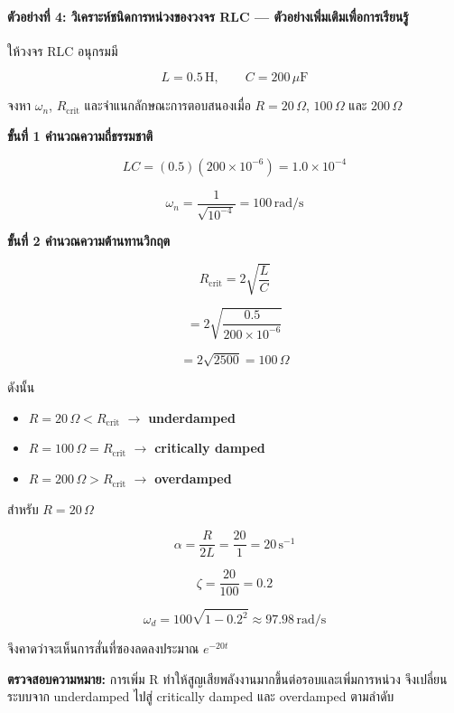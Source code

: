 \paragraph{ตัวอย่างที่ 4: วิเคราะห์ชนิดการหน่วงของวงจร RLC — ตัวอย่างเพิ่มเติมเพื่อการเรียนรู้}

ให้วงจร RLC อนุกรมมี

\[
L=0.5\,\text{H},\qquad C=200\,\mu\text{F}
\]

จงหา $\omega_n$, $R_{\text{crit}}$ และจำแนกลักษณะการตอบสนองเมื่อ $R=20\,\Omega$, $100\,\Omega$ และ $200\,\Omega$

\textbf{ขั้นที่ 1 คำนวณความถี่ธรรมชาติ}

\[
LC=(0.5)(200\times10^{-6})=1.0\times10^{-4}
\]

\[
\omega_n=\frac{1}{\sqrt{10^{-4}}}=100\,\text{rad/s}
\]

\textbf{ขั้นที่ 2 คำนวณความต้านทานวิกฤต}

\[
R_{\text{crit}}=2\sqrt{\frac{L}{C}}
\]

\[
=2\sqrt{\frac{0.5}{200\times10^{-6}}}
\]

\[
=2\sqrt{2500}=100\,\Omega
\]

ดังนั้น

\begin{itemize}
    \item $R=20\,\Omega<R_{\text{crit}}$ $\to$ \textbf{underdamped}
    \item $R=100\,\Omega=R_{\text{crit}}$ $\to$ \textbf{critically damped}
    \item $R=200\,\Omega>R_{\text{crit}}$ $\to$ \textbf{overdamped}
\end{itemize}

สำหรับ $R=20\,\Omega$

\[
\alpha=\frac{R}{2L}=\frac{20}{1}=20\,\text{s}^{-1}
\]

\[
\zeta=\frac{20}{100}=0.2
\]

\[
\omega_d=100\sqrt{1-0.2^2}\approx97.98\,\text{rad/s}
\]

จึงคาดว่าจะเห็นการสั่นที่ซองลดลงประมาณ $e^{-20t}$

\textbf{ตรวจสอบความหมาย:} การเพิ่ม R ทำให้สูญเสียพลังงานมากขึ้นต่อรอบและเพิ่มการหน่วง จึงเปลี่ยนระบบจาก underdamped ไปสู่ critically damped และ overdamped ตามลำดับ

